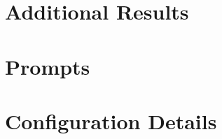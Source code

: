 \documentclass[11pt,a4paper]{report}
\begin{document}




\clearpage



\clearpage

\tableofcontents

\clearpage

\listoffigures

\clearpage

\listoftables

\clearpage









% 












\clearpage





\appendix

\chapter{Additional Results}


\chapter{Prompts}


\chapter{Configuration Details}

\end{document}
